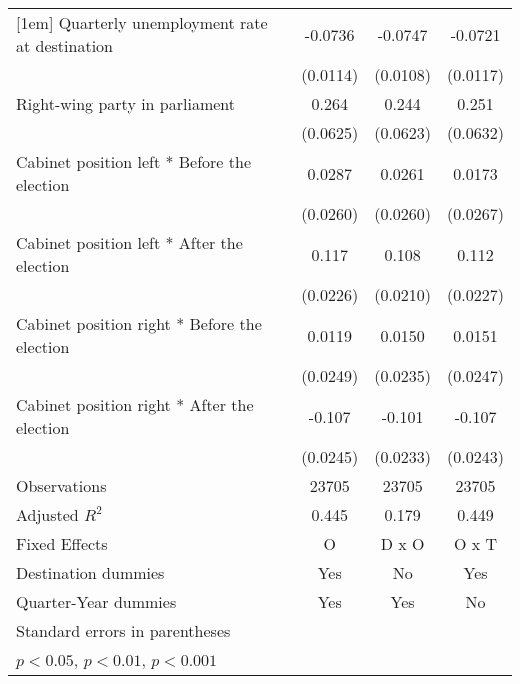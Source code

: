 \begin{table}[htbp]
\begin{tabular}{l*{3}{c}}
[1em]
Quarterly unemployment rate at destination&     -0.0736\sym{***}&     -0.0747\sym{***}&     -0.0721\sym{***}\\
                    &    (0.0114)         &    (0.0108)         &    (0.0117)         \\
[1em]
Right-wing party in parliament&       0.264\sym{***}&       0.244\sym{***}&       0.251\sym{***}\\
                    &    (0.0625)         &    (0.0623)         &    (0.0632)         \\
[1em]
Cabinet position left * Before the election&      0.0287         &      0.0261         &      0.0173         \\
                    &    (0.0260)         &    (0.0260)         &    (0.0267)         \\
[1em]
Cabinet position left * After the election&       0.117\sym{***}&       0.108\sym{***}&       0.112\sym{***}\\
                    &    (0.0226)         &    (0.0210)         &    (0.0227)         \\
[1em]
Cabinet position right * Before the election&      0.0119         &      0.0150         &      0.0151         \\
                    &    (0.0249)         &    (0.0235)         &    (0.0247)         \\
[1em]
Cabinet position right * After the election&      -0.107\sym{***}&      -0.101\sym{***}&      -0.107\sym{***}\\
                    &    (0.0245)         &    (0.0233)         &    (0.0243)         \\
\hline
Observations        &       23705         &       23705         &       23705         \\
Adjusted \(R^{2}\)  &       0.445         &       0.179         &       0.449         \\
Fixed Effects       &           O         &       D x O         &       O x T         \\
Destination dummies &         Yes         &          No         &         Yes         \\
Quarter-Year dummies&         Yes         &         Yes         &          No         \\
\hline\hline
\multicolumn{4}{l}{\footnotesize Standard errors in parentheses}\\
\multicolumn{4}{l}{\footnotesize \sym{*} \(p<0.05\), \sym{**} \(p<0.01\), \sym{***} \(p<0.001\)}\\
\end{tabular}
\end{table}
